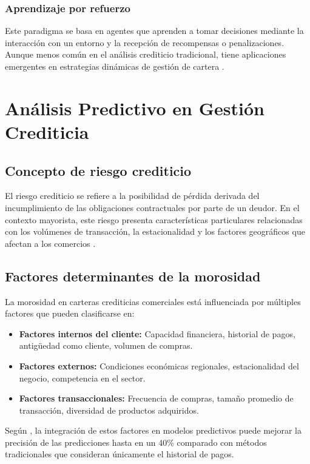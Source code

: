 \subsubsection{Aprendizaje por refuerzo}
Este paradigma se basa en agentes que aprenden a tomar decisiones mediante la interacción con un entorno y la recepción de recompensas o penalizaciones. Aunque menos común en el análisis crediticio tradicional, tiene aplicaciones emergentes en estrategias dinámicas de gestión de cartera \cite{garcia2024machine}.

\section{Análisis Predictivo en Gestión Crediticia}
\subsection{Concepto de riesgo crediticio}
El riesgo crediticio se refiere a la posibilidad de pérdida derivada del incumplimiento de las obligaciones contractuales por parte de un deudor. En el contexto mayorista, este riesgo presenta características particulares relacionadas con los volúmenes de transacción, la estacionalidad y los factores geográficos que afectan a los comercios \cite{ramirez2023predictive}.

\subsection{Factores determinantes de la morosidad}
La morosidad en carteras crediticias comerciales está influenciada por múltiples factores que pueden clasificarse en:

\begin{itemize}
    \item \textbf{Factores internos del cliente:} Capacidad financiera, historial de pagos, antigüedad como cliente, volumen de compras.
    \item \textbf{Factores externos:} Condiciones económicas regionales, estacionalidad del negocio, competencia en el sector.
    \item \textbf{Factores transaccionales:} Frecuencia de compras, tamaño promedio de transacción, diversidad de productos adquiridos.
\end{itemize}

Según \cite{torres2023inteligencia}, la integración de estos factores en modelos predictivos puede mejorar la precisión de las predicciones hasta en un 40\% comparado con métodos tradicionales que consideran únicamente el historial de pagos.

